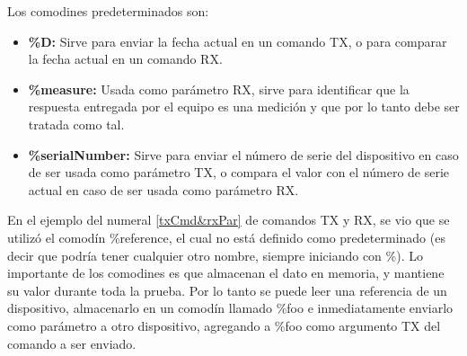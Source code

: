 \documentclass[a4paper,12pt]{refart}
\begin{document}
Los comodines predeterminados son:
\begin{itemize}
\item \textbf{\%D:} Sirve para enviar la fecha actual en un comando TX, o para comparar la fecha actual en un comando RX.
\item \textbf{\%measure:} Usada como parámetro RX, sirve para identificar que la respuesta entregada por el equipo es una medición y que por lo tanto debe ser tratada como tal.
\item \textbf{\%serialNumber:} Sirve para enviar el número de serie del dispositivo en caso de ser usada como parámetro TX, o compara el valor con el número de serie actual en caso de ser usada como parámetro RX.
\end{itemize}

En el ejemplo del numeral \ref{txCmd&rxPar} de comandos TX y RX, se vio que se utilizó el comodín \%reference, el cual no está definido como predeterminado (es decir que podría tener cualquier otro nombre, siempre iniciando con \%). Lo importante de los comodines es que almacenan el dato en memoria, y mantiene su valor durante toda la prueba. Por lo tanto se puede leer una referencia de un dispositivo, almacenarlo en un comodín llamado \%foo e inmediatamente enviarlo como parámetro a otro dispositivo, agregando a \%foo como argumento TX del comando a ser enviado.
\end{document}
